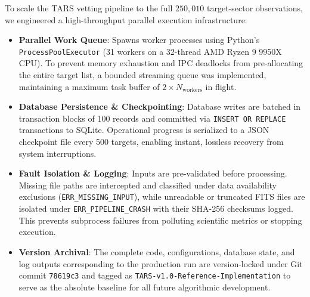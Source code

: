 To scale the TARS vetting pipeline to the full $250,010$ target-sector observations, we engineered a high-throughput parallel execution infrastructure:
\begin{itemize}
    \item \textbf{Parallel Work Queue}: Spawns worker processes using Python's \texttt{ProcessPoolExecutor} (31 workers on a 32-thread AMD Ryzen 9 9950X CPU). To prevent memory exhaustion and IPC deadlocks from pre-allocating the entire target list, a bounded streaming queue was implemented, maintaining a maximum task buffer of $2 \times N_{\text{workers}}$ in flight.
    \item \textbf{Database Persistence \& Checkpointing}: Database writes are batched in transaction blocks of 100 records and committed via \texttt{INSERT OR REPLACE} transactions to SQLite. Operational progress is serialized to a JSON checkpoint file every 500 targets, enabling instant, lossless recovery from system interruptions.
    \item \textbf{Fault Isolation \& Logging}: Inputs are pre-validated before processing. Missing file paths are intercepted and classified under data availability exclusions (\texttt{ERR\_MISSING\_INPUT}), while unreadable or truncated FITS files are isolated under \texttt{ERR\_PIPELINE\_CRASH} with their SHA-256 checksums logged. This prevents subprocess failures from polluting scientific metrics or stopping execution.
    \item \textbf{Version Archival}: The complete code, configurations, database state, and log outputs corresponding to the production run are version-locked under Git commit \texttt{78619c3} and tagged as \texttt{TARS-v1.0-Reference-Implementation} to serve as the absolute baseline for all future algorithmic development.
\end{itemize}

